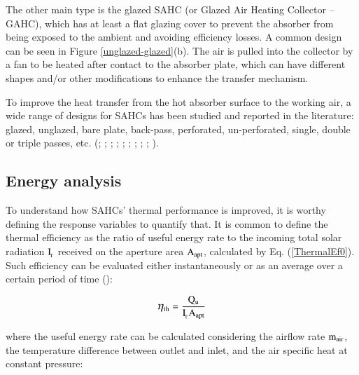 The other main type is the glazed SAHC (or Glazed Air Heating Collector -- GAHC), which has at least a flat glazing cover to prevent the absorber from being exposed to the ambient and avoiding efficiency losses. A common design can be seen in Figure \ref{unglazed-glazed}(b). The air is pulled into the collector by a fan to be heated after contact to the absorber plate, which can have different shapes and/or other modifications to enhance the transfer mechanism.


To improve the heat transfer from the hot absorber surface to the working air, a wide range of designs for SAHCs has been studied and reported in the literature: glazed, unglazed, bare plate, back-pass, perforated, un-perforated, single, double or triple passes, etc. (\cite{Kutscher1994}; \cite{Christensen1997}; \cite{Gawlik2005}; \cite{Koyuncu2006}; \cite{Leon2007}; \cite{Tchinda2008}; \cite{El-Sebaii2010}; \cite{Athienitis2011}; \cite{Zheng2016}; \cite{Li2016}). %

\subsection{Energy analysis}

To understand how SAHCs' thermal performance is improved, it is worthy defining the response variables to quantify that. It is common to define the thermal efficiency as the ratio of useful energy rate to the incoming total solar radiation $\rm{I_{\!_T}}$ received on the aperture area $\rm{A_{apt}}$, calculated by Eq. (\ref{ThermalEf0}). Such efficiency can be evaluated either instantaneously or as an average over a certain period of time (\cite{Goswami2015}):

\begin{equation}
	\mathrm{\mathlarger{\eta}_{\mathrm{th}} = \frac{Q_u}{I_{\!_T}A_{apt}}}
	\label{ThermalEf0}
\end{equation}

\noindent where the useful energy rate can be calculated considering the airflow rate $\rm{m_{air}}$, the temperature difference between outlet and inlet, and the air specific heat at constant pressure:

